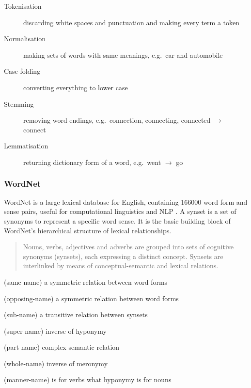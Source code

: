\begin{description}
  \item [Tokenisation] discarding white spaces and punctuation and making every term a token
  \item [Normalisation] making sets of words with same meanings, e.g.\ car and automobile
  \item [Case-folding] converting everything to lower case
  \item [Stemming] removing word endings, e.g.\ connection, connecting, connected $\to$ connect
  \item [Lemmatisation] returning dictionary form of a word, e.g.\ went $\to$ go
\end{description}


\subsubsection{WordNet}
\label{s:wordnet}

WordNet is a large lexical database for English, containing \num{166000} word form and sense pairs, useful for computational linguistics and \ac{NLP} \autocite{Miller1995}. A synset is a set of synonyms to represent a specific word sense. It is the basic building block of WordNet's hierarchical structure of lexical relationships.

\begin{quotation}
  Nouns, verbs, adjectives and adverbs are grouped into sets of cognitive synonyms (synsets), each expressing a distinct concept. Synsets are interlinked by means of conceptual-semantic and lexical relations. 
\end{quotation}

\begin{description}[leftmargin=2.75cm]
  \item [Synonymy] (same-name) a symmetric relation between word forms
  \item [Antonymy] (opposing-name) a symmetric relation between word forms
  \item [Hyponymy] (sub-name) a transitive relation between synsets
  \item [Hypernymy] (super-name) inverse of hyponymy
  \item [Meronymy] (part-name) complex semantic relation
  \item [Holonymy] (whole-name) inverse of meronymy
  \item [Troponymy] (manner-name) is for verbs what hyponymy is for nouns
\end{description}

